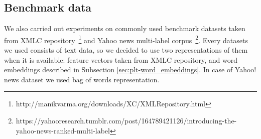 \documentclass{article}
\newcommand{\Algo}[1]{\textsc{#1}}
\begin{document}
{%





\subsection{Benchmark data}

We also carried out experiments on commonly used benchmark datasets taken from XMLC repository~\footnote{http://manikvarma.org/downloads/XC/XMLRepository.html} and Yahoo news multi-label corpus~\footnote{https://yahooresearch.tumblr.com/post/164789421126/introducing-the-yahoo-news-ranked-multi-label}. Every datasets we used consists of text data, so we decided to use two representations of them when it is available: feature vectors taken from XMLC repository, and word embeddings described in Subsection \ref{sec:plt-word_embeddings}. In case of Yahoo! news dataset we used bag of words representation.


}
\end{document}
